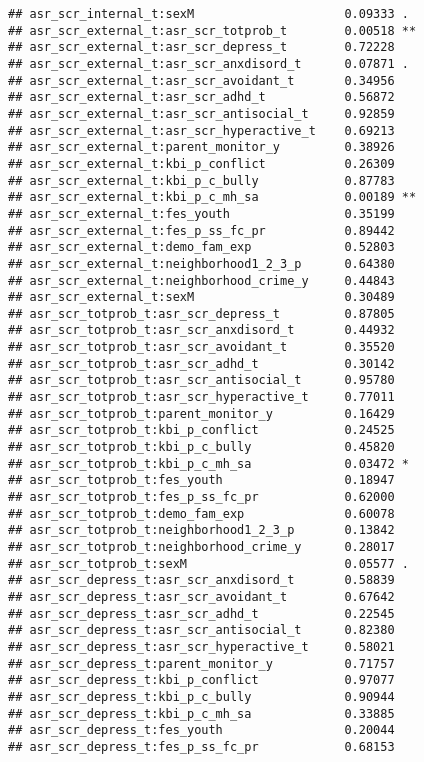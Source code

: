 \documentclass[
]{article}
\begin{document}
\begin{verbatim}
## asr_scr_internal_t:sexM                     0.09333 .  
## asr_scr_external_t:asr_scr_totprob_t        0.00518 ** 
## asr_scr_external_t:asr_scr_depress_t        0.72228    
## asr_scr_external_t:asr_scr_anxdisord_t      0.07871 .  
## asr_scr_external_t:asr_scr_avoidant_t       0.34956    
## asr_scr_external_t:asr_scr_adhd_t           0.56872    
## asr_scr_external_t:asr_scr_antisocial_t     0.92859    
## asr_scr_external_t:asr_scr_hyperactive_t    0.69213    
## asr_scr_external_t:parent_monitor_y         0.38926    
## asr_scr_external_t:kbi_p_conflict           0.26309    
## asr_scr_external_t:kbi_p_c_bully            0.87783    
## asr_scr_external_t:kbi_p_c_mh_sa            0.00189 ** 
## asr_scr_external_t:fes_youth                0.35199    
## asr_scr_external_t:fes_p_ss_fc_pr           0.89442    
## asr_scr_external_t:demo_fam_exp             0.52803    
## asr_scr_external_t:neighborhood1_2_3_p      0.64380    
## asr_scr_external_t:neighborhood_crime_y     0.44843    
## asr_scr_external_t:sexM                     0.30489    
## asr_scr_totprob_t:asr_scr_depress_t         0.87805    
## asr_scr_totprob_t:asr_scr_anxdisord_t       0.44932    
## asr_scr_totprob_t:asr_scr_avoidant_t        0.35520    
## asr_scr_totprob_t:asr_scr_adhd_t            0.30142    
## asr_scr_totprob_t:asr_scr_antisocial_t      0.95780    
## asr_scr_totprob_t:asr_scr_hyperactive_t     0.77011    
## asr_scr_totprob_t:parent_monitor_y          0.16429    
## asr_scr_totprob_t:kbi_p_conflict            0.24525    
## asr_scr_totprob_t:kbi_p_c_bully             0.45820    
## asr_scr_totprob_t:kbi_p_c_mh_sa             0.03472 *  
## asr_scr_totprob_t:fes_youth                 0.18947    
## asr_scr_totprob_t:fes_p_ss_fc_pr            0.62000    
## asr_scr_totprob_t:demo_fam_exp              0.60078    
## asr_scr_totprob_t:neighborhood1_2_3_p       0.13842    
## asr_scr_totprob_t:neighborhood_crime_y      0.28017    
## asr_scr_totprob_t:sexM                      0.05577 .  
## asr_scr_depress_t:asr_scr_anxdisord_t       0.58839    
## asr_scr_depress_t:asr_scr_avoidant_t        0.67642    
## asr_scr_depress_t:asr_scr_adhd_t            0.22545    
## asr_scr_depress_t:asr_scr_antisocial_t      0.82380    
## asr_scr_depress_t:asr_scr_hyperactive_t     0.58021    
## asr_scr_depress_t:parent_monitor_y          0.71757    
## asr_scr_depress_t:kbi_p_conflict            0.97077    
## asr_scr_depress_t:kbi_p_c_bully             0.90944    
## asr_scr_depress_t:kbi_p_c_mh_sa             0.33885    
## asr_scr_depress_t:fes_youth                 0.20044    
## asr_scr_depress_t:fes_p_ss_fc_pr            0.68153    

\end{verbatim}
\end{document}
